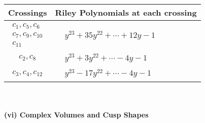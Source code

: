 \documentclass[1p]{elsarticle_modified}
\theoremstyle{definition}
\begin{document}
\begin{tabular}{m{50pt}|m{274pt}}
Crossings & \hspace{64pt}Riley Polynomials at each crossing \\
\hline $$\begin{aligned}c_{1},c_{5},c_{6}\\c_{7},c_{9},c_{10}\\c_{11}\end{aligned}$$&$\begin{aligned}
&y^{23}+35 y^{22}+\cdots+12 y-1
\end{aligned}$\\
\hline $$\begin{aligned}c_{2},c_{8}\end{aligned}$$&$\begin{aligned}
&y^{23}+3 y^{22}+\cdots-4 y-1
\end{aligned}$\\
\hline $$\begin{aligned}c_{3},c_{4},c_{12}\end{aligned}$$&$\begin{aligned}
&y^{23}-17 y^{22}+\cdots-4 y-1
\end{aligned}$\\
\hline
\end{tabular}\\~\\
\newpage\flushleft \textbf{(vi) Complex Volumes and Cusp Shapes}
\end{document}
